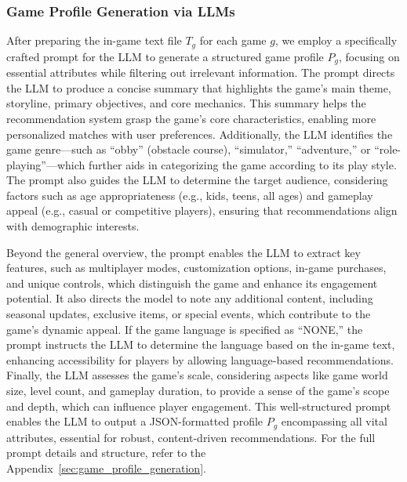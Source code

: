 \subsubsection{Game Profile Generation via LLMs}
After preparing the in-game text file $T_g$ for each game $g$, we employ a specifically crafted prompt for the LLM to generate a structured game profile $P_g$, focusing on essential attributes while filtering out irrelevant information. The prompt directs the LLM to produce a concise summary that highlights the game’s main theme, storyline, primary objectives, and core mechanics. This summary helps the recommendation system grasp the game’s core characteristics, enabling more personalized matches with user preferences. Additionally, the LLM identifies the game genre—such as “obby” (obstacle course), “simulator,” “adventure,” or “role-playing”—which further aids in categorizing the game according to its play style. The prompt also guides the LLM to determine the target audience, considering factors such as age appropriateness (e.g., kids, teens, all ages) and gameplay appeal (e.g., casual or competitive players), ensuring that recommendations align with demographic interests.

Beyond the general overview, the prompt enables the LLM to extract key features, such as multiplayer modes, customization options, in-game purchases, and unique controls, which distinguish the game and enhance its engagement potential. It also directs the model to note any additional content, including seasonal updates, exclusive items, or special events, which contribute to the game’s dynamic appeal. If the game language is specified as “NONE,” the prompt instructs the LLM to determine the language based on the in-game text, enhancing accessibility for players by allowing language-based recommendations. Finally, the LLM assesses the game’s scale, considering aspects like game world size, level count, and gameplay duration, to provide a sense of the game’s scope and depth, which can influence player engagement. This well-structured prompt enables the LLM to output a JSON-formatted profile $P_g$ encompassing all vital attributes, essential for robust, content-driven recommendations. For the full prompt details and structure, refer to the Appendix~\ref{sec:game_profile_generation}.

